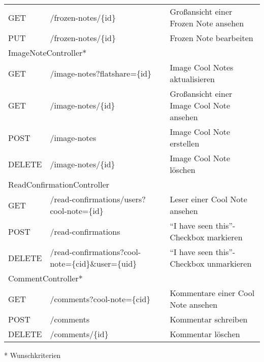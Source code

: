 \documentclass[a4paper]{scrreprt}
\begin{document}
\begin{flushleft}
\begin{longtable}{|p{}|p{}|p{}|}
		GET & /frozen-notes/\{id\} & Großansicht einer Frozen Note ansehen \\
		PUT & /frozen-notes/\{id\} & Frozen Note bearbeiten \\
		\hline
		\multicolumn{3}{|l|}{ImageNoteController*} \\
		\hline
		GET & /image-notes?flatshare=\{id\} & Image Cool Notes aktualisieren \\
		GET & /image-notes/\{id\} & Großansicht einer Image Cool Note ansehen \\
		POST & /image-notes & Image Cool Note erstellen \\
		DELETE & /image-notes/\{id\} & Image Cool Note löschen \\
		\hline	
		\multicolumn{3}{|l|}{ReadConfirmationController} \\
		\hline
		GET & /read-confirmations/users?cool-note=\{id\} & Leser einer Cool Note ansehen \\
		POST & /read-confirmations & ``I have seen this''-Checkbox markieren \\
		DELETE & /read-confirmations?cool-note=\{cid\}\&user=\{uid\} & ``I have seen this''-Checkbox unmarkieren \\
		\hline
		\multicolumn{3}{|l|}{CommentController*} \\
		\hline
		GET & /comments?cool-note=\{cid\} & Kommentare einer Cool Note ansehen \\
		POST & /comments & Kommentar schreiben \\
		DELETE & /comments/\{id\} & Kommentar löschen \\
		\hline
		\end{longtable}
	\end{flushleft}
	* Wunschkriterien
	
	\newpage
\end{document}
